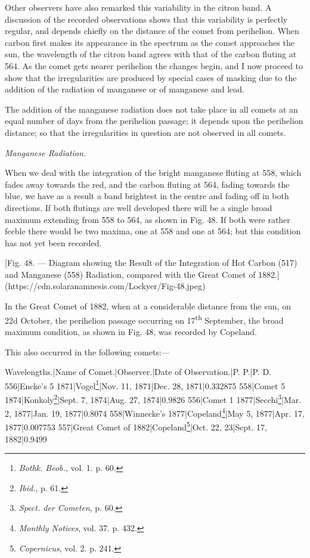 \documentclass[a4paper, 12pt, oneside, polutonikogreek, english]{article}
\begin{document}
Other observers have also remarked this variability in the citron band. A discussion of the recorded observations shows that this variability is perfectly regular, and depends chiefly on the distance of the comet from perihelion. When carbon first makes its appearance in the spectrum as the comet approaches the sun, the wavelength of the citron band agrees with that of the carbon fluting at 564. As the comet gets nearer perihelion the changes begin, and I now proceed to show that the irregularities are produced by special cases of masking due to the addition of the radiation of manganese or of manganese and lead.

The addition of the manganese radiation does not take place in all comets at an equal number of days from the perihelion passage; it depends upon the perihelion distance; so that the irregularities in question are not observed in all comets.

\emph{Manganese Radiation.}

When we deal with the integration of the bright manganese fluting at 558, which fades away towards the red, and the carbon fluting at 564, fading towards the blue, we have as a result a band brightest in the centre and fading off in both directions. If both flutings are well developed there will be a single broad maximum extending from 558 to 564, as shown in Fig. 48. If both were rather feeble there would be two maxima, one at 558 and one at 564; but this condition has not yet been recorded.

[Fig. 48. --- Diagram showing the Result of the Integration of Hot Carbon (517) and Manganese (558) Radiation, compared with the Great Comet of 1882.](https://cdn.solaranamnesis.com/Lockyer/Fig-48.jpeg)

In the Great Comet of 1882, when at a considerable distance from the sun, on 22d October, the perihelion passage occurring on 17\textsuperscript{th} September, the broad maximum condition, as shown in Fig. 48, was recorded by Copeland.

This also occurred in the following comets:---

Wavelengths.|Name of Comet.|Observer.|Date of Observation.|P. P.|P. D. 
556|Encke's 5 1871|Vogel\footnote{\emph{Bothk. Beob.}, vol. 1. p. 60.}|Nov. 11, 1871|Dec. 28, 1871|0.332875 
558|Comet 5 1874|Konkoly\footnote{\emph{Ibid.}, p. 61.}|Sept. 7, 1874|Aug. 27, 1874|0.9826 
556|Comet 1 1877|Secchi\footnote{\emph{Spect. der Cometen}, p. 60.}|Mar. 2, 1877|Jan. 19, 1877|0.8074 
558|Winnecke's 1877|Copeland\footnote{\emph{Monthly Notices}, vol. 37. p. 432.}|May 5, 1877|Apr. 17, 1877|0.007753 
557|Great Comet of 1882|Copeland\footnote{\emph{Copernicus}, vol. 2. p. 241.}|Oct. 22, 23|Sept. 17, 1882|0.9499 
\end{document}
